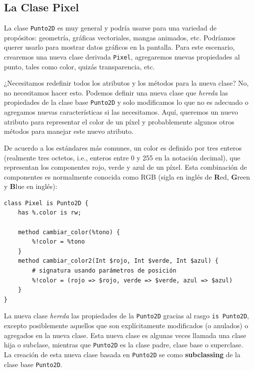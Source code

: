 \subsection{La Clase Pixel}

La clase {\tt Punto2D} es muy general y podría usarse para
una variedad de propósitos: geometría, gráficas vectoriales, 
mangas animados, etc. Podríamos querer usarlo para mostrar 
datos gráficos en la pantalla. Para este escenario, crearemos
una nueva clase derivada {\tt Pixel}, agregaremos nuevas 
propiedades al punto, tales como color, quizás transparencia, etc.

¿Necesitamos redefinir todos los atributos y los métodos para la 
nueva clase? No, no necesitamos hacer esto. Podemos definir una 
nueva clase que \emph{hereda} las propiedades de la clase base 
{\tt Punto2D} y solo modificamos lo que no es adecuado o agregamos nuevas
características si las necesitamos. Aquí, queremos un nuevo
atributo para representar el color de un píxel y probablemente
algunos otros métodos para manejar este nuevo atributo.

De acuerdo a los estándares más comunes, un color es definido
por tres enteros (realmente tres octetos, i.e., enteros entre 
0 y 255 en la notación decimal), que representan los componentes
rojo, verde y azul de un píxel. Esta combinación de componentes es normalmente
conocida como RGB (sigla en inglés de {\bf R}ed, {\bf G}reen y {\bf B}lue en inglés):

\begin{verbatim}
class Pixel is Punto2D {
    has %.color is rw;

    method cambiar_color(%tono) {
        %!color = %tono
    }
    method cambiar_color2(Int $rojo, Int $verde, Int $azul) {
        # signatura usando parámetros de posición
        %!color = (rojo => $rojo, verde => $verde, azul => $azul)
    }
}
\end{verbatim}

La nueva clase \emph{hereda} las propiedades de la {\tt Punto2D}
gracias al rasgo {\tt is Punto2D}, excepto posiblemente
aquellos que son explícitamente modificados (o anulados) o agregados
en la nueva clase. Esta nueva clase es algunas veces llamada
una clase hija o subclase, mientras que {\tt Punto2D} es la
clase padre, clase base o superclase. La creación de esta nueva
clase basada en {\tt Punto2D} se como {\bf subclassing} de la 
clase base {\tt Punto2D}.

